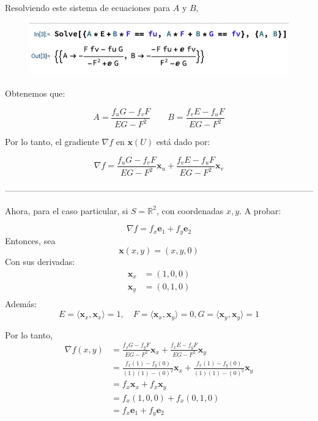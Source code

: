 \begin{problema}
\begin{dem}
Resolviendo este sistema de ecuaciones para $A$ y $B$,

\begin{figure}[H]
    \centering
    \includegraphics[scale=0.5]{imagenes/4.png}
\end{figure}

Obtenemos que:

$$ A = \frac{f_uG - f_vF}{EG - F^2}\qquad  B = \frac{f_vE - f_uF}{EG - F^2}$$


Por lo tanto, el gradiente $\nabla f$ en $\mathbf{x}(U)$ está dado por:

$$ \nabla f=\frac{f_{u} G-f_{v} F}{E G-F^{2}} \mathbf{x}_{u}+\frac{f_{v} E-f_{u} F}{E G-F^{2}} \mathbf{x}_{v} $$


------------------------------------------------------------------------------------------------------------

Ahora, para el caso particular, si $S=\mathbb{R}^{2}$, con coordenadas $x, y$. A probar:

$$
\nabla f=f_{x} \mathbf{e}_{1}+f_{y} \mathbf{e}_{2}
$$
Entonces, sea 
$$\mathbf{x}(x,y)=(x,y,0)$$
Con sus derivadas: 
\begin{align*}
    \mathbf{x}_x &=(1,0,0) \\
    \mathbf{x}_y &= (0,1,0)\\
\end{align*}
Además: 
$$E=\langle\mathbf{x}_x,\mathbf{x}_x\rangle= 1, \quad F=\langle\mathbf{x}_x,\mathbf{x}_y\rangle= 0, G=\langle\mathbf{x}_y,\mathbf{x}_y\rangle= 1 $$

Por lo tanto,
\begin{align*}
    \nabla f(x,y) &= \frac{f_{x} G-f_{y} F}{E G-F^{2}} \mathbf{x}_{x}+\frac{f_{x} E-f_{y} F}{E G-F^{2}} \mathbf{x}_{y}\\
    &= \frac{f_{x} (1)-f_{y} (0)}{(1) (1)-(0)^{2}} \mathbf{x}_{x}+\frac{f_{x} (1)-f_{y} (0)}{(1) (1)-(0)^{2}} \mathbf{x}_{y}\\
    &= f_{x} \mathbf{x}_{x}+f_{x}\mathbf{x}_{y}\\
    &= f_{x} (1,0,0)+f_{x}(0,1,0)\\
    &= f_{x} \mathbf{e}_{1}+f_{y} \mathbf{e}_{2}
\end{align*}
\end{dem}

\end{problema}

